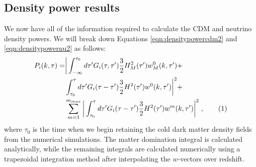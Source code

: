 \documentclass[twocolumn,superscriptaddress,prd]{revtex4}
\makeatletter
\newcommand\numberthis{\addtocounter{equation}{1}\tag{\theequation}}
\let\save@mathaccent\mathaccent
\newcommand*\if@single[3]{%
  \setbox0\hbox{${\mathaccent"0362{#1}}^H$}%
  \setbox2\hbox{${\mathaccent"0362{\kern0pt#1}}^H$}%
  \ifdim\ht0=\ht2 #3\else #2\fi
  }
\newcommand*\rel@kern[1]{\kern#1\dimexpr\macc@kerna}
\newcommand*\widebar[1]{\@ifnextchar^{{\wide@bar{#1}{0}}}{\wide@bar{#1}{1}}}
\newcommand*\wide@bar[2]{\if@single{#1}{\wide@bar@{#1}{#2}{1}}{\wide@bar@{#1}{#2}{2}}}
\newcommand*\wide@bar@[3]{%
  \begingroup
  \def\mathaccent##1##2{%
    \let\mathaccent\save@mathaccent
    \if#32 \let\macc@nucleus\first@char \fi
    \setbox\z@\hbox{$\macc@style{\macc@nucleus}_{}$}%
    \setbox\tw@\hbox{$\macc@style{\macc@nucleus}{}_{}$}%
    \dimen@\wd\tw@
    \advance\dimen@-\wd\z@
    \divide\dimen@ 3
    \@tempdima\wd\tw@
    \advance\@tempdima-\scriptspace
    \divide\@tempdima 10
    \advance\dimen@-\@tempdima
    \ifdim\dimen@>\z@ \dimen@0pt\fi
    \rel@kern{0.6}\kern-\dimen@
    \if#31
      \overline{\rel@kern{-0.6}\kern\dimen@\macc@nucleus\rel@kern{0.4}\kern\dimen@}%
      \advance\dimen@0.4\dimexpr\macc@kerna
      \let\final@kern#2%
      \ifdim\dimen@<\z@ \let\final@kern1\fi
      \if\final@kern1 \kern-\dimen@\fi
    \else
      \overline{\rel@kern{-0.6}\kern\dimen@#1}%
    \fi
  }%
  \macc@depth\@ne
  \let\math@bgroup\@empty \let\math@egroup\macc@set@skewchar
  \mathsurround\z@ \frozen@everymath{\mathgroup\macc@group\relax}%
  \macc@set@skewchar\relax
  \let\mathaccentV\macc@nested@a
  \if#31
    \macc@nested@a\relax111{#1}%
  \else
    \def\gobble@till@marker##1\endmarker{}%
    \futurelet\first@char\gobble@till@marker#1\endmarker
    \ifcat\noexpand\first@char A\else
      \def\first@char{}%
    \fi
    \macc@nested@a\relax111{\first@char}%
  \fi
  \endgroup
}
\makeatother
\begin{document}
 
\subsection{ Density power results}
We now have all of the information required to calculate the CDM
and neutrino density powers.  We will break down Equations
\eqref{eqn:densitypowercdm2} and \eqref{eqn:densitypowernu2} as follows:
\begin{align*}\label{eqn:densbymode}
  P_i(k,\tau) =& \bigg| \int_{-\infty}^{\tau_0} d\tau' G_i(\tau,\tau')
                 \frac{3}{2} H^2_M(\tau') w^0_M(k,\tau') +\\
  &\int_{\tau_0}^{\tau} d \tau'
  G_i(\tau-\tau') \frac{3}{2} H^2(\tau') w^0(k,\tau') \bigg |^2 +\\
&  \sum_{m=1}^{m_{max}} \bigg| \int_{\tau_0}^\tau d\tau' G_i(\tau -
  \tau' ) \frac{3}{2} H^2 (\tau') w^m(k,\tau') \bigg |^2 \;, \numberthis
\end{align*}
where $\tau_0$ is the time when we begin retaining the cold dark
matter density fields from the numerical simulations.
The matter domination integral is calculated analytically, while the
remaining integrals are calculated numerically using a trapezoidal
integration method after interpolating the $w$-vectors over redshift.
\end{document}
